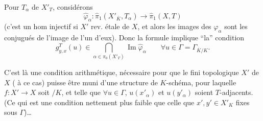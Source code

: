 Pour   $T_\alpha$ de $X'_T$, considérons
\[
\widehat\varphi_\alpha:\widehat\pi_1(X'_{\overline K},T_\alpha)\longrightarrow\widehat\pi_1(X,T)
\]
(c'est un hom injectif si $X'$ rev. étale de $X$, et alors les  images des $\varphi_\alpha$ sont les conjugués de l'image de l'un d'eux). Donc  la formule  implique ``la'' condition 
\[
g^T_{y,x}(u)\in\bigcap_{\alpha\in\pi_0(X'_T)}\operatorname{Im}\widehat\varphi_\alpha
\qquad\forall u\in\Gamma=\Gamma_{\overline K/K}.
\]

C'est là une condition arithmétique, nécessaire pour que le  fini  topologique $X'$ de $X$ ( à ce cas) puisse  être muni d'une  structure de $K$-schéma, pour laquelle $f:X'\to X$ soit $ /K$, et telle que  $\forall u\in\Gamma$, $u(x'_\alpha)$ et $u(y'_\alpha)$ soient $T$-adjacents. (Ce qui est une condition nettement plus faible que celle que $x',y'\in X'_K$  fixes sous $\Gamma$)\ldots
{}
